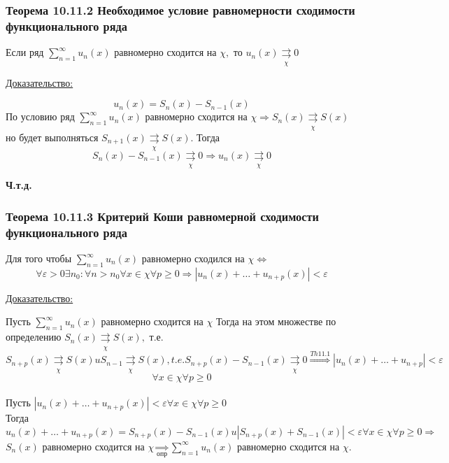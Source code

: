 \documentclass[12pt]{article}
\newcommand*\circled[1]{\tikz[baseline=(char.base)]{
    \node[shape=circle, draw, inner sep=1pt, 
        minimum height=12pt] (char) {#1};}}
\let\oldsum\sum
\renewcommand{\sum}{\oldsum\limits}
\begin{document}
  \subsubsection*{Теорема 10.11.2 Необходимое условие равномерности сходимости функционального ряда}\label{th:10.11.2}
  \par\noindent
  Если ряд $\sum_{n=1}^{\infty} u_n(x)$ равномерно сходится на $\chi,$ то $u_n(x)\underset{\chi}{\rightrightarrows} 0$

  \underline{Доказательство:}
  \begin{adjustwidth}{1.5em}{1.5em}
    \[u_n(x)=S_n(x)-S_{n-1}(x)\]
    По условию ряд $\sum_{n=1}^{\infty} u_n(x)$ равномерно сходится на $\chi \Rightarrow S_n(x) \underset{\chi}{\rightrightarrows} S(x)$
    но будет выполняться $S_{n+1}(x)\underset{\chi}{\rightrightarrows} S(x)$. Тогда 
    \[S_n(x)-S_{n-1}(x)\underset{\chi}{\rightrightarrows} 0 \Rightarrow u_n(x)\underset{\chi}{\rightrightarrows} 0\]

  \end{adjustwidth}
  \begin{center}
    \textbf{Ч.т.д.}
  \end{center}

  \subsubsection*{Теорема 10.11.3 Критерий Коши равномерной сходимости функционального ряда}\label{th:10.11.3}
  \par\noindent
  Для того чтобы $\sum_{n=1}^{\infty}u_n(x)$ равномерно сходился на $\chi \Leftrightarrow$
  \[\forall \varepsilon> 0 \exists n_0: \forall n>n_0 \forall x \in \chi \forall p \geq 0 \Rightarrow |u_n(x)+\dots+u_{n+p}(x)|<\varepsilon\]
  
  \underline{Доказательство:}
  \begin{adjustwidth}{1.5em}{1.5em}
    \circled{$\Rightarrow$} Пусть $\sum_{n=1}^{\infty} u_n(x)$ равномерно сходится на $\chi$ Тогда на этом множестве
    по определению
    $S_n(x)\underset{\chi}{\rightrightarrows} S(x),$ т.е.\\
    \[S_{n+p}(x)\underset{\chi}{\rightrightarrows} S(x) u S_{n-1}\underset{\chi}{\rightrightarrows} S(x),t.e. S_{n+p}(x)-S_{n-1}(x)
    \underset{\chi}{\rightrightarrows} 0 \overset{\hyperref[th:10.11.1]{Th 11.1}}{\Rightarrow} 
    |u_n(x)+\dots+u_{n+p}|<\varepsilon\]
    \[\forall x \in \chi \forall p \geq 0\]\\

    \circled{$\Leftarrow$} Пусть $|u_n(x)+\dots+u_{n+p}(x)|<\varepsilon \forall x \in \chi \forall p \geq 0$\\
    Тогда \[u_n(x)+\dots+u_{n+p}(x)=S_{n+p}(x)-S_{n-1}(x) u |S_{n+p}(x)+S_{n-1}(x)|<\varepsilon \forall x \in \chi
    \forall p\geq0 \Rightarrow\]
    $S_n(x)$ равномерно сходится на $\chi \underset{\hyperref[th:10.11.3]{\text{опр}}}{\Rightarrow}
    \sum_{n=1}^{\infty} u_n(x)$ равномерно сходится на $\chi$. \\
  \end{adjustwidth}
\end{document}
